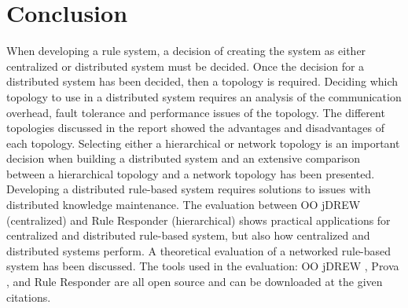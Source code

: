 \documentclass[12pt]{report}
\begin{document}
\chapter{Conclusion}

When developing a rule system, a decision of creating the system as either centralized or distributed system must be decided.  Once the decision for a distributed system has been decided, then a topology is required.  Deciding which topology to use in a distributed system requires an analysis of the communication overhead, fault tolerance and performance issues of the topology.  The different topologies discussed in the report showed the advantages and disadvantages of each topology.  Selecting either a hierarchical or network topology is an important decision when building a distributed system and an extensive comparison between a hierarchical topology and a network topology has been presented.  Developing a distributed rule-based system requires solutions to issues with distributed knowledge maintenance.  The evaluation between OO jDREW (centralized) and Rule Responder (hierarchical) shows practical applications for centralized and distributed rule-based system, but also how centralized and distributed systems perform.  A theoretical evaluation of a networked rule-based system has been discussed. The tools used in the evaluation: OO jDREW \cite{OOjDREW}, Prova \cite{PROVA}, and Rule Responder \cite{RuleResponder} are all open source and can be downloaded at the given citations.


\singlespacing

\end{document}
